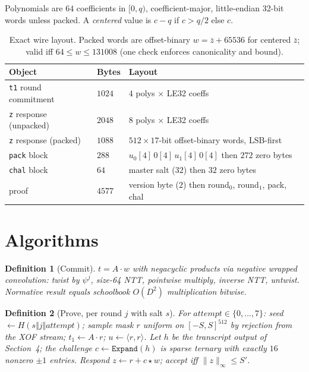 \documentclass[11pt,a4paper]{article}
\newtheorem{definition}{Definition}[section]
\begin{document}
Polynomials are $64$ coefficients in $[0,q)$, coefficient-major,
little-endian 32-bit words unless packed. A \emph{centered} value is
$c - q$ if $c > q/2$ else $c$.

\begin{table}[h]
\centering
\begin{tabular}{lll}
\toprule
Object & Bytes & Layout \\
\midrule
\texttt{t1} round commitment & $1024$ & $4$ polys $\times$ LE32 coeffs \\
\texttt{z} response (unpacked) & $2048$ & $8$ polys $\times$ LE32 coeffs \\
\texttt{z} response (packed) & $1088$ & $512 \times 17$-bit offset-binary words, LSB-first \\
\texttt{pack} block & $288$ & $u_0[4]\,0[4]\,u_1[4]\,0[4]$ then $272$ zero bytes \\
\texttt{chal} block & $64$ & master salt ($32$) then $32$ zero bytes \\
proof & $4577$ & version byte ($2$) then round$_0$, round$_1$, pack, chal \\
\bottomrule
\end{tabular}
\caption{Exact wire layout. Packed words are offset-binary
$w = \bar{z} + 65536$ for centered $\bar{z}$; valid iff
$64 \le w \le 131008$ (one check enforces canonicality and bound).}
\end{table}

\section{Algorithms}

\begin{definition}[Commit]
$t = A\cdot w$ with negacyclic products via negative wrapped convolution:
twist by $\psi^j$, size-64 NTT, pointwise multiply, inverse NTT, untwist.
Normative result equals schoolbook $O(D^2)$ multiplication bitwise.
\end{definition}

\begin{definition}[Prove, per round $j$ with salt $s$]
For $\mathit{attempt} \in \{0,\dots,7\}$: seed
$\gets H(s\Vert j\Vert\mathit{attempt})$; sample mask $r$ uniform on
$[-S,S]^{512}$ by rejection from the XOF stream; $t_1 \gets A\cdot r$;
$u \gets \langle r,r\rangle$. Let $h$ be the transcript output of
Section~4; the challenge $c \gets \texttt{Expand}(h)$
is sparse ternary with exactly $16$ nonzero $\pm 1$ entries.
Respond $z \gets r + c\star w$; accept iff
$\lVert z\rVert_\infty \le S'$.
\end{definition}
\end{document}
